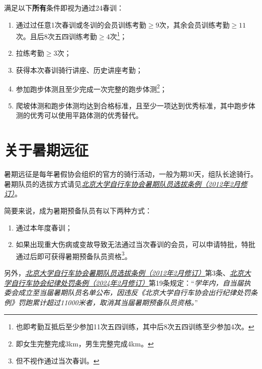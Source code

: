 \documentclass[UTF8]{ctexart}
\begin{document}
满足以下\textbf{所有}条件即视为通过24春训：
\begin{enumerate}[nosep,left=4em]
    \item 通过过任意1次春训或冬训的会员训练考勤$\ge 9$次，其余会员训练考勤$\ge 11$次。且后8次五四训练考勤$\ge 4$次\footnote{也即考勤互抵后至少参加11次五四训练，其中后8次五四训练至少参加4次。}；
    \item 拉练考勤$\ge 3$次；
    \item 获得本次春训骑行讲座、历史讲座考勤；
    \item 参加跑步体测且至少完成一次完整的跑步体测\footnote{即女生完整完成3km，男生完整完成4km。}；
    \item 爬坡体测和跑步体测均达到合格标准，且至少一项达到优秀标准，其中跑步体测的优秀可以使用平路体测的优秀替代。
\end{enumerate}

\section{关于暑期远征}

暑期远征是每年暑假协会组织的官方的骑行活动，一般为期30天，组队长途骑行。暑期队员的选拔方式请见\href{https://chexie.net/bbs/content/?bid=1&tid=9610&p=1}{\textit{北京大学自行车协会暑期队员选拔条例（2012年2月修订）}}。

简要来说，成为暑期预备队员有以下两种方式：
\begin{enumerate}[nosep,left=4em]
    \item 通过本年度春训；
    \item 如果出现重大伤病或变故导致无法通过当次春训的会员，可以申请特批，特批通过后即可获得暑期预备队员资格\footnote{但不视作通过当次春训。}。
\end{enumerate}

另外，\href{https://chexie.net/bbs/content/?bid=1&tid=9610&p=1}{\textit{北京大学自行车协会暑期队员选拔条例（2012年2月修订）}}第3条、\href{https://chexie.net/bbs/content/?bid=1&tid=9751&p=1}{\textit{北京大学自行车协会纪律处罚条例（2024年2月修订）}}第19条规定：“\textit{学年内，自当届执委会成立至当届暑期队员名单公布，因违反《北京大学自行车协会出行纪律处罚条例》罚跑累计超过11000米者，取消其当届暑期预备队员资格。}”


\end{document}
